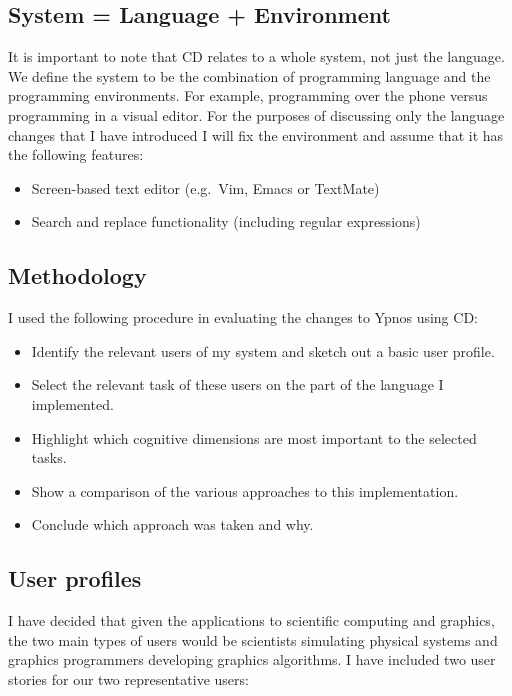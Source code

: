 \documentclass[12pt,a4paper,twoside]{scrbook}
\begin{document}
\subsection{System = Language + Environment}

It is important to note that CD relates to a whole system, not just the
language. We define the system to be the combination of programming language and
the programming environments. For example, programming over the phone versus
programming in a visual editor. For the purposes of discussing only the language
changes that I have introduced I will fix the environment and assume that it has
the following features:

\begin{itemize}
\item
  Screen-based text editor (e.g.~Vim, Emacs or TextMate)
\item
  Search and replace functionality (including regular expressions)
\end{itemize}

\subsection{Methodology}

I used the following procedure in evaluating the changes to Ypnos using
CD:

\begin{itemize}
\item
  Identify the relevant users of my system and sketch out a basic user
  profile.
\item
  Select the relevant task of these users on the part of the language I
  implemented.
\item
  Highlight which cognitive dimensions are most important to the selected tasks.
\item
  Show a comparison of the various approaches to this implementation.
\item
  Conclude which approach was taken and why.
\end{itemize}

\subsection{User profiles}

I have decided that given the applications to scientific computing and graphics,
the two main types of users would be scientists simulating physical systems and
graphics programmers developing graphics algorithms. I have included two user
stories for our two representative users:
\end{document}
